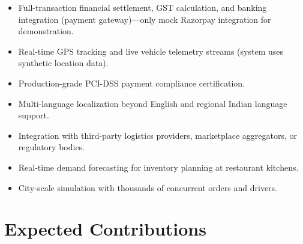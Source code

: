 \documentclass[12pt,a4paper]{report}
\begin{document}
\begin{itemize}
    \item Full-transaction financial settlement, GST calculation, and banking integration (payment gateway)---only mock Razorpay integration for demonstration.
    \item Real-time GPS tracking and live vehicle telemetry streams (system uses synthetic location data).
    \item Production-grade PCI-DSS payment compliance certification.
    \item Multi-language localization beyond English and regional Indian language support.
    \item Integration with third-party logistics providers, marketplace aggregators, or regulatory bodies.
    \item Real-time demand forecasting for inventory planning at restaurant kitchens.
    \item City-scale simulation with thousands of concurrent orders and drivers.
\end{itemize}

\section{Expected Contributions}
\end{document}
